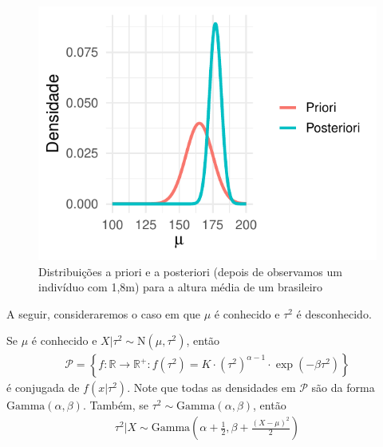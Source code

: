 \begin{example}
\begin{knitrout}
\begin{figure}[t]
{\centering \includegraphics[width=\maxwidth]{./figures/normal_normal-1} 

}

\caption[Distribuições a priori e a posteriori (depois de observamos um indivíduo com 1,8m) para a altura média de um brasileiro]{Distribuições a priori e a posteriori (depois de observamos um indivíduo com 1,8m) para a altura média de um brasileiro}\label{fig:normal_normal}
\end{figure}


\end{knitrout}

\end{example}

A seguir, consideraremos o caso em que
$\mu$ é conhecido e $\tau^{2}$ é desconhecido.
\begin{lemma}
 Se $\mu$ é conhecido e
 $X|\tau^{2} \sim \text{N}(\mu,\tau^{2})$, então
 \begin{align*}
  \mathcal{P} = \left\{f: \mathbb{R} \rightarrow \mathbb{R}^{+}: f(\tau^{2}) = K \cdot \left(\tau^{2}\right)^{\alpha-1} \cdot \exp(-\beta \tau^{2}) \right\}
 \end{align*}
 é conjugada de $f(x|\tau^{2})$.
 Note que todas as densidades em $\mathcal{P}$ são
 da forma $\text{Gamma}(\alpha,\beta)$.
 Também, se $\tau^{2} \sim \text{Gamma}(\alpha,\beta)$,
 então
 \begin{align*}
  \tau^{2}|X \sim \text{Gamma}\left(\alpha+\frac{1}{2},
  \beta+\frac{(X-\mu)^{2}}{2}\right)
 \end{align*}
\end{lemma}

